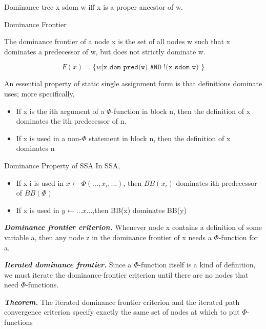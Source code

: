 \begin{definition}{Dominance tree}
    x sdom w iff x is a proper ancestor of w.  

\end{definition}

\begin{definition}{Dominance Frontier}


The dominance frontier of a node x is the set of all nodes w such that
x dominates a predecessor of w, but does not strictly dominate w.

$$
F(x)=  \{w | \texttt{x  dom pred(w) AND   !(x  sdom  w) } \}
$$
\end{definition}





An essential property of static single assignment form is that definitions dominate uses; more specifically,
\begin{itemize}
    \item  If x is the ith argument of a $\Phi$-function in block n, then the definition of x dominates the ith predecessor of n.
    \item  If x is used in a non-$\Phi$ statement in block n, then the definition of x dominates n
\end{itemize}

\begin{note}{Dominance Property of SSA	}
  In SSA,

  \begin{itemize}
      \item If x i is used in $x \leftarrow \Phi (..., x_i , ...)$, then $BB(x_i )$ dominates ith predecessor of $BB(\Phi)$
      \item If x is used in $y \leftarrow ...x...$,then BB(x) dominates BB(y)
  \end{itemize}
\end{note}


\textbf{ \large \textit{Dominance frontier criterion.}} Whenever node x contains a definition of some variable a, then any node z in the dominance frontier of x needs a $\Phi$-function for a.


\textbf{ \large \textit{Iterated dominance frontier.}} Since a $\Phi$-function itself is a kind of definition, we must iterate the dominance-frontier criterion until there are no nodes that need $\Phi$-functions.


\textbf{ \large \textit{Theorem.}} The iterated dominance frontier criterion and the iterated path convergence criterion specify exactly the same set of nodes at which to put $\Phi$-functions

